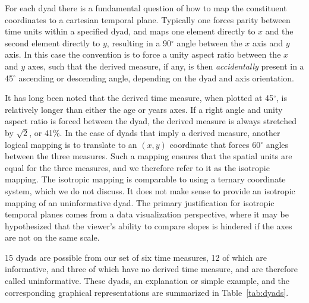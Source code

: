 \documentclass[11pt,oneside,a4paper]{article} %
\begin{document}
For each dyad there is a fundamental question of how to map the constituent
coordinates to a cartesian temporal plane. Typically one forces parity between time units within
a specified dyad, and maps one element directly to $x$ and the second element
directly to $y$, resulting in a 90$^\circ$ angle between the $x$ axis and $y$
axis. In this case the convention is to force a unity aspect ratio
between the $x$ and $y$ axes, such that the derived measure, if any, is then
\textit{accidentally} present in a 45$^\circ$ ascending or descending angle,
depending on the dyad and axis orientation. 

It has long been noted \citep{zeuner1869abhandlungen, perozzo1880della} that the
derived time measure, when plotted at 45$^\circ$, is relatively
longer than either the age or years axes. If a right angle and unity aspect
ratio is forced between the dyad, the derived measure is always stretched by
$\sqrt{2}$, or 41\%. In the case of dyads that imply a derived measure, another logical mapping is to translate to an $(x,y)$ coordinate that forces 60$^\circ$ angles between the three measures. Such a mapping ensures that the
spatial units are equal for the three measures, and we therefore refer to it as
the isotropic mapping. The isotropic mapping is comparable to using a ternary
coordinate system, which we do not discuss. It does not make sense to provide an isotropic mapping of an uninformative dyad. The primary justification for isotropic temporal planes comes from a data visualization perspective, where it may be
hypothesized that the viewer's ability to compare slopes is hindered if the axes
are not on the same scale.

15 dyads are possible from our set of six time measures, 12 of
which are informative, and three of which have no derived time measure, and are
therefore called uninformative. These dyads, an explanation or simple example,
and the corresponding graphical representations are summarized in Table~\ref{tab:dyads}.
\end{document}
